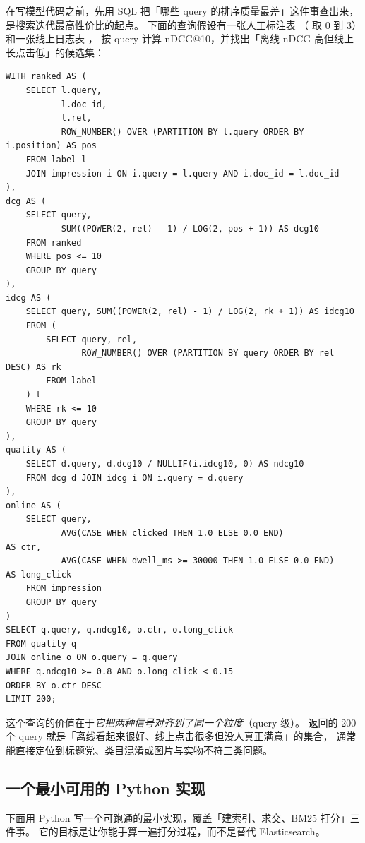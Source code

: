 在写模型代码之前，先用 SQL 把「哪些 query 的排序质量最差」这件事查出来，是搜索迭代最高性价比的起点。
下面的查询假设有一张人工标注表 （ 取 0 到 3）
和一张线上日志表 ，
按 query 计算 nDCG@10，并找出「离线 nDCG 高但线上长点击低」的候选集：

\begin{lstlisting}[style=growth, language=SQLx, caption={按 query 计算 nDCG 并交叉对照长点击}]
WITH ranked AS (
    SELECT l.query,
           l.doc_id,
           l.rel,
           ROW_NUMBER() OVER (PARTITION BY l.query ORDER BY i.position) AS pos
    FROM label l
    JOIN impression i ON i.query = l.query AND i.doc_id = l.doc_id
),
dcg AS (
    SELECT query,
           SUM((POWER(2, rel) - 1) / LOG(2, pos + 1)) AS dcg10
    FROM ranked
    WHERE pos <= 10
    GROUP BY query
),
idcg AS (
    SELECT query, SUM((POWER(2, rel) - 1) / LOG(2, rk + 1)) AS idcg10
    FROM (
        SELECT query, rel,
               ROW_NUMBER() OVER (PARTITION BY query ORDER BY rel DESC) AS rk
        FROM label
    ) t
    WHERE rk <= 10
    GROUP BY query
),
quality AS (
    SELECT d.query, d.dcg10 / NULLIF(i.idcg10, 0) AS ndcg10
    FROM dcg d JOIN idcg i ON i.query = d.query
),
online AS (
    SELECT query,
           AVG(CASE WHEN clicked THEN 1.0 ELSE 0.0 END)              AS ctr,
           AVG(CASE WHEN dwell_ms >= 30000 THEN 1.0 ELSE 0.0 END)    AS long_click
    FROM impression
    GROUP BY query
)
SELECT q.query, q.ndcg10, o.ctr, o.long_click
FROM quality q
JOIN online o ON o.query = q.query
WHERE q.ndcg10 >= 0.8 AND o.long_click < 0.15
ORDER BY o.ctr DESC
LIMIT 200;
\end{lstlisting}

这个查询的价值在于\emph{它把两种信号对齐到了同一个粒度}（query 级）。
返回的 200 个 query 就是「离线看起来很好、线上点击很多但没人真正满意」的集合，
通常能直接定位到标题党、类目混淆或图片与实物不符三类问题。

\subsection{一个最小可用的 Python 实现}

下面用 Python 写一个可跑通的最小实现，覆盖「建索引、求交、BM25 打分」三件事。
它的目标是让你能手算一遍打分过程，而不是替代 Elasticsearch。

